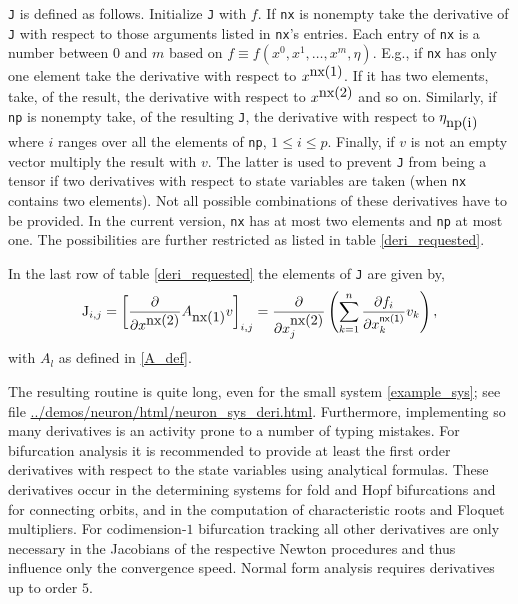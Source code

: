 \documentclass[10pt]{scrartcl}
\newcommand{\parm}[1]{\mathsf{#1}}
\newcommand{\blist}[1]{\mbox{\lstinline!#1!}}
\begin{document}
\blist{J} is defined as follows. Initialize \blist{J} with $f$. If
\blist{nx} is nonempty take the derivative of \blist{J} with respect
to those arguments listed in \blist{nx}'s entries. Each entry of
\blist{nx} is a number between $0$ and $m$ based on $f\equiv
f(x^0,x^1,\ldots,x^m,\eta)$.  E.g., if \blist{nx} has only one element
take the derivative with respect to $x^{\blist{nx(1)}}$.  If it has
two elements, take, of the result, the derivative with respect to
$x^{\blist{nx(2)}}$ and so on.  Similarly, if \blist{np} is nonempty
take, of the resulting \blist{J}, the derivative with respect to
$\eta_{\blist{np(i)}}$ where $i$ ranges over all the elements of
\blist{np}, $1\leq i \leq p$.  Finally, if $v$ is not an empty vector
multiply the result with $v$.  The latter is used to prevent \blist{J}
from being a tensor if two derivatives with respect to state variables
are taken (when \blist{nx} contains two elements).  Not all possible
combinations of these derivatives have to be provided.  In the current
version, \blist{nx} has at most two elements and \blist{np} at most
one.  The possibilities are further restricted as listed in table
\ref{deri_requested}.

In the last row of table \ref{deri_requested} the elements of \blist{J}
are given by,
\[
\blist{J}_{i,j}=\left[\frac{\partial}{\partial x^{\blist{nx(2)}}}
A_{\blist{nx(1)}}v\right]_{i,j}
=\frac{\partial}{\partial x_j^{\blist{nx(2)}}}
\left(\sum_{k=1}^n\frac{\partial f_i}{\partial x_k^{\parm{nx(1)}}} v_k
\right),
\]
with $A_l$ as defined in \eqref{A_def}.


The resulting routine is quite long, even for the small system
\eqref{example_sys}; see file \url{../demos/neuron/html/neuron_sys_deri.html}.
Furthermore, implementing so many derivatives is an activity prone to
a number of typing mistakes. %
For bifurcation analysis it is recommended to provide
at least the first order derivatives with respect to the state
variables using analytical formulas. These derivatives occur in the
determining systems for fold and Hopf bifurcations
and for connecting orbits,  
and in the computation of characteristic roots and Floquet
multipliers.  For codimension-$1$ bifurcation tracking all other
derivatives are only necessary in the Jacobians of the respective
Newton procedures and thus influence only the convergence
speed. Normal form analysis requires derivatives up to order $5$.
\end{document}
